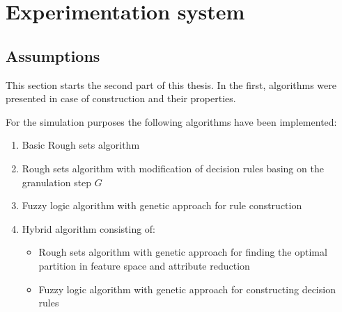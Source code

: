 \section{Experimentation system}
\label{cha:ExperimentAnalysis}
\subsection{Assumptions}
This section starts the second part of this thesis. In the first, algorithms
were presented in case of construction and their properties.

For the simulation purposes the following algorithms have been implemented:
\begin{enumerate}
    \item Basic Rough sets algorithm
    \item Rough sets algorithm with modification of decision rules basing on
        the granulation step $G$
    \item Fuzzy logic algorithm with genetic approach for rule construction
    \item Hybrid algorithm consisting of:
        \begin{itemize}
            \item Rough sets algorithm with genetic approach for finding the
                optimal partition in feature space and attribute reduction 
            \item Fuzzy logic algorithm with genetic approach for constructing
                decision rules
        \end{itemize}
\end{enumerate}

